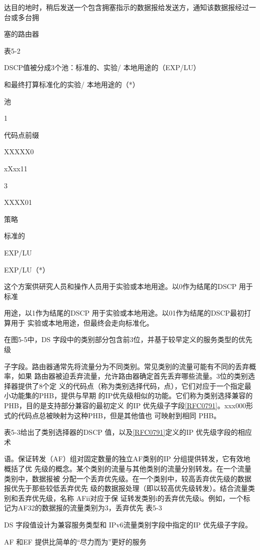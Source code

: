 达目的地时，稍后发送一个包含拥塞指示的数据报给发送方，通知该数据报经过一台或多台拥

塞的路由器

表5-2

DSCP值被分成3个池：标准的、实验/ 本地用途的（EXP/LU）

和最终打算标准化的实验/ 本地用途的（*）

池

1

代码点前缀

XXXXX0

xXxx11

3

XXXX01

策略

标准的

EXP/LU

EXP/LU（*）

这个方案供研究人员和操作人员用于实验或本地用途。以0作为结尾的DSCP 用于标准

用途，以1作为结尾的DSCP 用于实验或本地用途。以01作为结尾的DSCP最初打算用于
实验或本地用途，但最终会走向标准化。

在图5-5中，DS 字段中的类别部分包含前3位，并基于较早定义的服务类型的优先级

子字段。路由器通常先将流量分为不同类别。常见类别的流量可能有不同的丢弃概率，如果
路由器被迫丢弃流量，允许路由器确定首先丢弃哪些流量。3位的类别选择器提供了8个定
义的代码点（称为类别选择代码，点），它们对应于一个指定最小功能集的PHB，提供与早期
的IP优先级相似的功能。它们称为类别选择兼容的 PHB，目的是支持部分兼容的最初定义
的IP 优先级子字段\href{https://www.rfc-editor.org/rfc/rfc0791}{[RFC0791]}。xxx000形式的代码点总被映射为这种PHB，但是其他值也
可映射到相同 PHB。

表5-3给出了类别选择器的DSCP 值，以及\href{https://www.rfc-editor.org/rfc/rfc0791}{[RFC0791]}定义的IP 优先级字段的相应术

语。保证转发（AF）组对固定数量的独立AF类别的IP 分组提供转发，它有效地概括了优
先级的概念。某个类别的流量与其他类别的流量分别转发。在一个流量类别中，数据报被
分配一个丢弃优先级。在一个类别中，较高丢弃优先级的数据报优先于那些较低丢弃优先
级的数据报处理（即以较高优先级转发）。结合流量类别和丢弃优先级，名称 AFii对应于保
证转发类别i的丢弃优先级i。例如，一个标记为AF32的数据报的流量类别为3，丢弃优先
表5-3

DS 字段值设计为兼容服务类型和 IPv6流量类别字段中指定的IP 优先级子字段。

AF 和EF 提供比简单的“尽力而为”更好的服务

